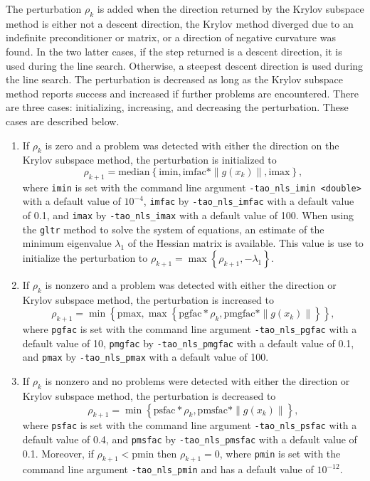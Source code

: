 The perturbation $\rho_k$ is added when the direction returned by the
Krylov subspace method is either not a descent direction, the Krylov method
diverged due to an indefinite preconditioner or matrix, or a direction of 
negative curvature was found.  In the two latter cases, if the step returned
is a descent direction, it is used during the line search.  Otherwise, a
steepest descent direction is used during the line search.  The perturbation
is decreased as long as the Krylov subspace method reports success and 
increased if further problems are encountered.  There are three cases:
initializing, increasing, and decreasing the perturbation.  These cases
are described below.
\begin{enumerate}
\item If $\rho_k$ is zero and a problem was detected with either the
direction on the Krylov subspace method, the perturbation is initialized to
\[
\rho_{k+1} = \mbox{median}\left\{\mbox{imin}, \mbox{imfac} * \|g(x_k)\|, \mbox{imax}\right\},
\]
where {\tt imin} is set with the command line argument 
{\tt -tao\_nls\_imin <double>} with a default value of $10^{-4}$,
{\tt imfac} by {\tt -tao\_nls\_imfac} with a default value of 0.1, and 
{\tt imax} by {\tt -tao\_nls\_imax} with a default value of 100.  
When using the {\tt gltr} method to solve the system of equations, an
estimate of the minimum eigenvalue $\lambda_1$ of the Hessian matrix 
is available.  This value is use to initialize the perturbation to
$\rho_{k+1} = \max\left\{\rho_{k+1}, -\lambda_1\right\}$.
\item If $\rho_k$ is nonzero and a problem was detected with either the 
direction or Krylov subspace method, the perturbation is increased to 
\[
\rho_{k+1} = \min\left\{\mbox{pmax}, \max\left\{\mbox{pgfac} * \rho_k, \mbox{pmgfac} * \|g(x_k)\|\right\}\right\},
\]
where {\tt pgfac} is set with the command line argument {\tt -tao\_nls\_pgfac}
with a default value of 10, {\tt pmgfac} by {\tt -tao\_nls\_pmgfac} with a
default value of 0.1, and {\tt pmax} by {\tt -tao\_nls\_pmax} with a default
value of 100.
\item If $\rho_k$ is nonzero and no problems were detected with either
the direction or Krylov subspace method, the perturbation is decreased to
\[
\rho_{k+1} = \min\left\{\mbox{psfac} * \rho_k, \mbox{pmsfac} * \|g(x_k)\|\right\},
\]
where {\tt psfac} is set with the command line argument {\tt -tao\_nls\_psfac}
with a default value of 0.4, and {\tt pmsfac} by {\tt -tao\_nls\_pmsfac} with
a default value of 0.1.  Moreover, if $\rho_{k+1} < \mbox{pmin}$ then 
$\rho_{k+1} = 0$, where {\tt pmin} is set with the command line argument 
{\tt -tao\_nls\_pmin} and has a default value of $10^{-12}$.
\end{enumerate}

